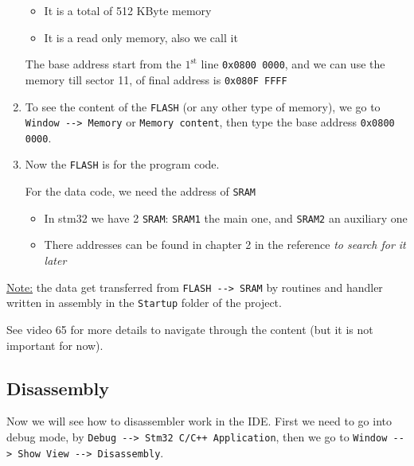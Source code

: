 \begin{enumerate}
    
    \begin{itemize}
        \item It is a total of 512 KByte memory
        
        \item It is a read only memory, also we call it 
        
    \end{itemize}
    
The base address start from the $\mathrm{1}^\mathrm{st}$ line  \verb|0x0800 0000|, and we can use the memory till sector 11, of final address is \verb|0x080F FFFF|


\item To see the content of the \verb|FLASH| (or any other type of memory), we go to \verb|Window --> Memory| or \verb|Memory content|, then type the base address \verb|0x0800 0000|.

\item Now the \verb|FLASH| is for the program code. 

For the data code, we need the address of \verb|SRAM|

\begin{itemize}
    \item In stm32 we have 2 \verb|SRAM|: \verb|SRAM1| the main one, and \verb|SRAM2| an auxiliary one
    
    \item There addresses can be found in chapter 2 in the reference  \textit{to search for it later}
\end{itemize}
    
    
    
\end{enumerate}


\underline{Note:} the data get transferred from \verb|FLASH --> SRAM| by routines and handler written in assembly in the \verb|Startup| folder of the project.

See video 65 for more details to navigate through the content (but it is not important for now).

\newpage
\subsection{Disassembly}

Now we will see how to disassembler work in the IDE. First we need to go into debug mode, by \verb|Debug --> Stm32 C/C++ Application|, then we go to \verb|Window --> Show View --> Disassembly|.\\

